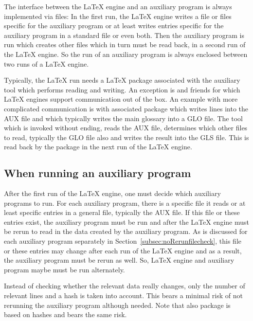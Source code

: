 The interface between the \LaTeX{} engine and an auxiliary program 
is always implemented via files: 
In the first run, the \LaTeX{} engine writes a file or files 
specific for the auxiliary program 
or at least writes entries specific for the auxiliary program 
in a standard file or even both. 
Then the auxiliary program is run which creates other files 
which in turn must be read back, in a second run of the \LaTeX{} engine. 
So the run of an auxiliary program 
is always enclosed between two runs of a \LaTeX{} engine. 

Typically, the \LaTeX{} run needs a \LaTeX{} package 
associated with the auxiliary tool 
which performs reading and writing. 
An exception is  and friends 
for which \LaTeX{} engines support communication out of the box. 
An example with more complicated communication 
is  with associated package  
which writes lines into the AUX file 
and which typically writes the main glossary into a GLO file. 
The tool  which is invoked without ending, 
reads the AUX file, determines which other files to read, 
typically the GLO file also 
and writes the result into the GLS file. 
This is read back by the package  
in the next run of the \LaTeX{} engine. 


\subsection{When running an auxiliary program}\label{subsec:firstRunAux}

After the first run of the \LaTeX{} engine, 
one must decide which auxiliary programs to run. 
For each auxiliary program, there is a specific file it reads 
or at least specific entries in a general file, typically the AUX file. 
If this file or these entries exist, the auxiliary program must be run 
and after the \LaTeX{} engine must be rerun 
to read in the data created by the auxiliary program. 
As is discussed for each auxiliary program separately 
in Section~\ref{subsec:noRerunfilecheck}, 
this file or these entries may change after each run of the \LaTeX{} engine 
and as a result, the auxiliary program must be rerun as well. 
So, \LaTeX{} engine and auxiliary program maybe must be run alternately. 

Instead of checking whether the relevant data really changes, 
only the number of relevant lines and a hash is taken into account. 
This bears a minimal risk of not rerunning the auxiliary program although needed. 
Note that also package  is based on hashes and bears the same risk. 

